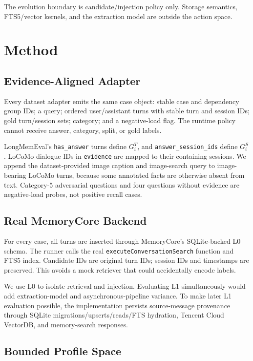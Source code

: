 \documentclass[10pt]{article}
\newcommand{\code}[1]{\texttt{#1}}
\begin{document}
The evolution boundary is candidate/injection policy only. Storage semantics,
FTS5/vector kernels, and the extraction model are outside the action space.

\section{Method}

\subsection{Evidence-Aligned Adapter}

Every dataset adapter emits the same case object: stable case and dependency
group IDs; a query; ordered user/assistant turns with stable turn and session
IDs; gold turn/session sets; category; and a negative-load flag. The runtime
policy cannot receive answer, category, split, or gold labels.

LongMemEval's \code{has\_answer} turns define $G_i^T$, and
\code{answer\_session\_ids} define $G_i^S$. LoCoMo dialogue IDs in
\code{evidence} are mapped to their containing sessions. We append the
dataset-provided image caption and image-search query to image-bearing LoCoMo
turns, because some annotated facts are otherwise absent from text. Category-5
adversarial questions and four questions without evidence are negative-load
probes, not positive recall cases.

\subsection{Real MemoryCore Backend}

For every case, all turns are inserted through MemoryCore's SQLite-backed L0
schema. The runner calls the real \code{executeConversationSearch} function and
FTS5 index. Candidate IDs are original turn IDs; session IDs and timestamps are
preserved. This avoids a mock retriever that could accidentally encode labels.

We use L0 to isolate retrieval and injection. Evaluating L1 simultaneously
would add extraction-model and asynchronous-pipeline variance. To make later L1
evaluation possible, the implementation persists source-message provenance
through SQLite migrations/upserts/reads/FTS hydration, Tencent Cloud VectorDB,
and memory-search responses.

\subsection{Bounded Profile Space}
\end{document}
